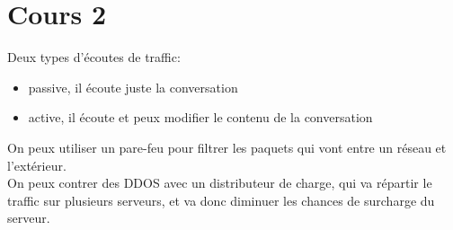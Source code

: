 \section{Cours 2}
Deux types d'écoutes de traffic:
\begin{itemize}
	\item passive, il écoute juste la conversation
	\item active, il écoute et peux modifier le contenu de la conversation
\end{itemize}

On peux utiliser un pare-feu pour filtrer les paquets qui vont entre un réseau et l'extérieur.\\
On peux contrer des DDOS avec un distributeur de charge, qui va répartir le traffic sur plusieurs serveurs, et va donc
diminuer les chances de surcharge du serveur.
